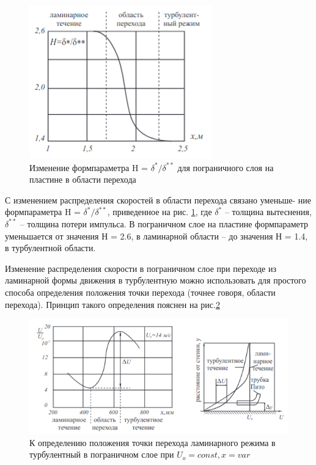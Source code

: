 \documentclass[12pt,a4paper]{article}
\begin{document}
\begin{figure}
	\includegraphics[width=1 \linewidth]{3.png}
	\caption{Изменение формпараметра H = $\delta^*/\delta^{**}$ для пограничного слоя на пластине в области перехода}
	\label{pic3}
\end{figure}
С изменением распределения скоростей в области перехода связано уменьше-
ние формпараметра H = $\delta^*/\delta^{**}$, приведенное на рис. \ref{pic3}, где $\delta^*$ -- толщина вытеснения, $\delta^{**}$ -- толщина потери импульса. В пограничном слое на пластине формпараметр уменьшается от значения Н = 2.6, в ламинарной области -- до значения Н = 1.4, в турбулентной области.
\par Изменение распределения скорости в пограничном слое при переходе из ламинарной формы движения в турбулентную можно использовать для простого способа определения положения точки перехода (точнее говоря, области перехода). Принцип такого определения пояснен на рис.\ref{pic4}
\begin{figure}[h!]
    \centering
    \includegraphics[width = 1.0 \textwidth]{4.png}
    \caption{К определению положения точки перехода ламинарного режима в турбулентный в пограничном слое при $U_o= const, x = var$}
    \label{pic4}
\end{figure}
\end{document}
